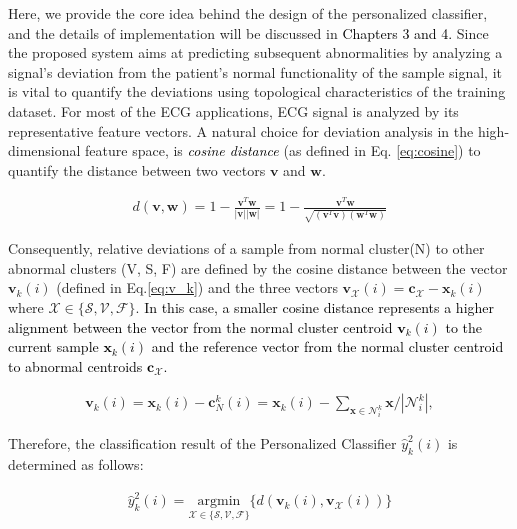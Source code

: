 Here, we provide the core idea behind the design of the personalized classifier, and the details of implementation will be discussed in \textcolor{black}{Chapters 3 and 4.} 
Since the proposed system aims at predicting subsequent abnormalities by analyzing a signal's deviation from the patient's normal functionality of the sample signal, it is vital to quantify the deviations using topological characteristics of the training dataset. For most of the ECG applications, ECG signal is analyzed by its representative feature vectors. A natural choice for deviation analysis in the high-dimensional feature space, is \textcolor{black}{\textit{cosine distance}} (as defined in Eq. \ref{eq:cosine}) to quantify the distance between two vectors $\textbf{v}$ and $\textbf{w}$.

\begin{align}
\label{eq:cosine}
d(\mathbf{v},\mathbf{w})= 1 - \frac{\mathbf{v}^T\mathbf{w}}{|\mathbf{v}||\mathbf{w}|}=1 - \frac{\mathbf{v}^T\mathbf{w}}{\sqrt{(\mathbf{v}^T\mathbf{v})(\mathbf{w}^T\mathbf{w})}}
\end{align}

Consequently, relative deviations of a sample from normal cluster(N) to other abnormal clusters (V, S, F) are defined by the cosine distance between the vector $\mathbf{v}_k(i)$ (defined in Eq.\ref{eq:v_k}) and the three vectors $\mathbf{v}_{\mathcal{X}}(i)=\mathbf{c}_{\mathcal{X}}-\mathbf{x}_k(i)$ where $\mathcal{X} \in \{ \mathcal{S}, \mathcal{V}, \mathcal{F}\}$. \textcolor{black}{In this case, a smaller cosine distance represents a higher alignment between the vector from the normal cluster centroid $\mathbf{v}_k(i)$ to the current sample $\mathbf{x}_k(i)$ and the reference vector from the normal cluster centroid to abnormal centroids $\mathbf{c}_{\mathcal{X}}$.}


\begin{align}
\label{eq:v_k}
\mathbf{v}_k(i)=\mathbf{x}_k(i)-\mathbf{c}_N^k(i) = \mathbf{x}_k(i)- {\sum_{\mathbf{x} \in \mathcal{N}_i^k} \mathbf{x}}/{|\mathcal{N}_i^k|}, 
\end{align}

Therefore, the classification result of the Personalized Classifier $\hat{y}^2_k(i)$ is determined as follows:

\begin{align}
\label{eq:personal_discrim}
\hat{y}^2_k(i) = \underset{\mathcal{X} \in \{ \mathcal{S}, \mathcal{V}, \mathcal{F} \}}{\text{argmin}}\{ d(\mathbf{v}_k(i),\mathbf{v}_{\mathcal{X}}(i)) \} 
\end{align}

